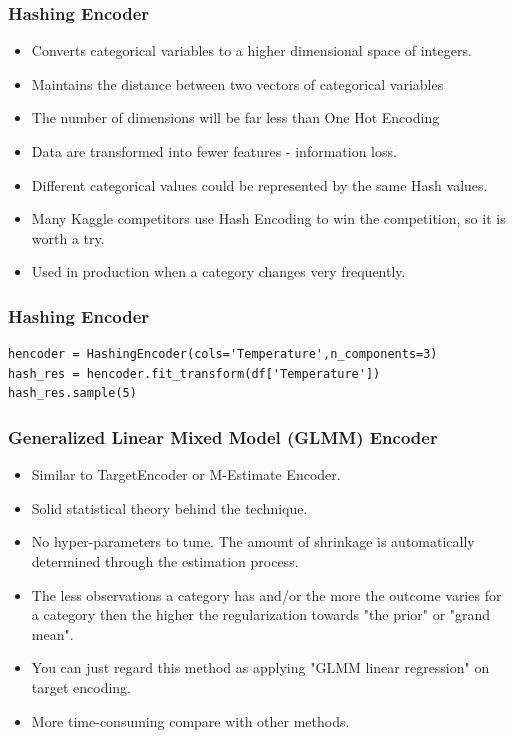 \documentclass{beamer}
\begin{document}
    \begin{frame}
        \frametitle{Hashing Encoder}
        \begin{itemize}
            \item Converts categorical variables to a higher dimensional space of integers.
            \pause
            \item Maintains the distance between two vectors of categorical variables
            \pause
            \item The number of dimensions will be far less than One Hot Encoding
            \pause
            \item Data are transformed into fewer features - information loss.
            \pause
            \item Different categorical values could be represented by the same Hash values.
            \pause
            \item Many Kaggle competitors use Hash Encoding to win the competition, so it is
            worth a try.
            \pause
            \item Used in production when a category changes very frequently.
        \end{itemize}
    \end{frame}

    \begin{frame}[fragile]
        \frametitle{Hashing Encoder}
        \begin{lstlisting}
hencoder = HashingEncoder(cols='Temperature',n_components=3)
hash_res = hencoder.fit_transform(df['Temperature'])
hash_res.sample(5)
        \end{lstlisting}
    \end{frame}

    \begin{frame}
        \frametitle{Generalized Linear Mixed Model (GLMM) Encoder }
        \begin{itemize}
            \item Similar to TargetEncoder or M-Estimate Encoder.
            \pause
            \item Solid statistical theory behind the technique.
            \pause
            \item No hyper-parameters to tune. The amount of shrinkage is automatically
            determined through the estimation process.
            \pause
            \item The less observations a category has and/or the more the outcome varies for a
            category then the higher the regularization towards "the prior" or "grand mean".
            \pause
            \item You can just regard this method as applying "GLMM linear regression" on target
            encoding.
            \pause
            \item More time-consuming compare with other methods.
        \end{itemize}
    \end{frame}
\end{document}
